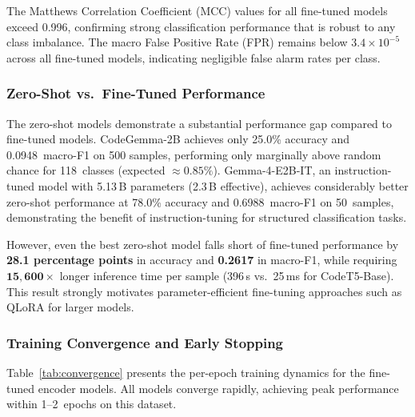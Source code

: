 The Matthews Correlation Coefficient (MCC) values for all fine-tuned models
exceed 0.996, confirming strong classification performance that is robust
to any class imbalance.  The macro False Positive Rate (FPR) remains below
$3.4 \times 10^{-5}$ across all fine-tuned models, indicating negligible
false alarm rates per class.

\subsubsection{Zero-Shot vs.\ Fine-Tuned Performance}
The zero-shot models demonstrate a substantial performance gap compared to
fine-tuned models.  CodeGemma-2B achieves only 25.0\% accuracy and
0.0948~macro-F1 on 500 samples, performing only marginally above random
chance for 118~classes (expected $\approx 0.85\%$).  Gemma-4-E2B-IT, an
instruction-tuned model with 5.13\,B parameters (2.3\,B effective),
achieves considerably better zero-shot performance at 78.0\% accuracy and
0.6988~macro-F1 on 50~samples, demonstrating the benefit of
instruction-tuning for structured classification tasks.

However, even the best zero-shot model falls short of fine-tuned
performance by \textbf{28.1 percentage points} in accuracy and
\textbf{0.2617} in macro-F1, while requiring $\mathbf{15{,}600\times}$
longer inference time per sample (396\,s vs.\ 25\,ms for CodeT5-Base).
This result strongly motivates parameter-efficient fine-tuning approaches
such as QLoRA for larger models.

\subsubsection{Training Convergence and Early Stopping}
Table~\ref{tab:convergence} presents the per-epoch training dynamics for
the fine-tuned encoder models.  All models converge rapidly, achieving peak
performance within 1--2~epochs on this dataset.

